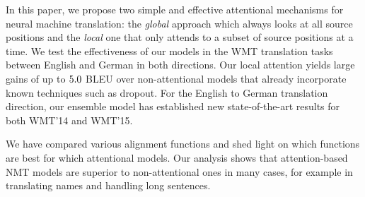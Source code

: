 In this paper, we propose two simple and effective attentional mechanisms for
neural machine translation: the {\it global} approach which always looks at all
source positions and the {\it local} one that only attends to a subset of source
positions at a time. We test the effectiveness of our models in the WMT
translation tasks between English and German in both directions. 
Our local attention yields large gains of up to
$5.0{}$ BLEU over non-attentional models that already incorporate known
techniques such as dropout. For the English to German translation direction, our
ensemble model has established new state-of-the-art
results for both WMT'14 and WMT'15.

We have compared various alignment functions and shed light on which functions
are best for which attentional models.
Our analysis shows that attention-based NMT models are superior to
non-attentional ones in many cases, for example in translating names and
handling long
sentences.
